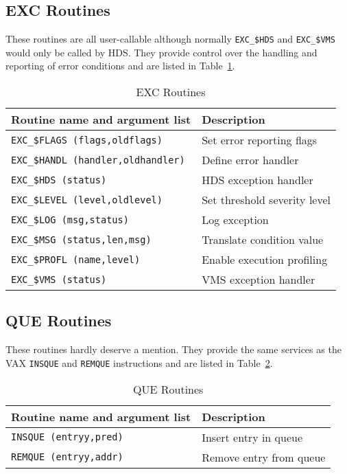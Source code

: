 \clearpage
\subsection {EXC Routines}

These routines are all user-callable although normally {\tt EXC\_\$HDS}
and {\tt EXC\_\$VMS} would only be called by HDS. They provide control over
the handling and reporting of error conditions and are listed in
Table~\ref{exc_routines}.

\begin {table}[htbp]
\begin {center}
\begin {tabular}{||l|l||}
\hline
Routine name and argument list		& Description \\
\hline
{\tt EXC\_\$FLAGS (flags,oldflags)}	& Set error reporting flags \\
{\tt EXC\_\$HANDL (handler,oldhandler)}	& Define error handler \\
{\tt EXC\_\$HDS (status)}		& HDS exception handler \\
{\tt EXC\_\$LEVEL (level,oldlevel)}	& Set threshold severity level \\
{\tt EXC\_\$LOG (msg,status)}		& Log exception \\
{\tt EXC\_\$MSG (status,len,msg)}	& Translate condition value \\
{\tt EXC\_\$PROFL (name,level)}		& Enable execution profiling \\
{\tt EXC\_\$VMS (status)}		& VMS exception handler \\
\hline
\end {tabular}
\caption {EXC Routines}
\label {exc_routines}
\end {center}
\end {table}

\subsection {QUE Routines}

These routines hardly deserve a mention. They provide the same services
as the VAX {\tt INSQUE} and {\tt REMQUE} instructions and are listed in
Table~\ref{que_routines}.

\begin {table}[htbp]
\begin {center}
\begin {tabular}{||l|l||}
\hline
Routine name and argument list	& Description \\
\hline
{\tt INSQUE (entryy,pred)}	& Insert entry in queue \\
{\tt REMQUE (entryy,addr)}	& Remove entry from queue \\
\hline
\end {tabular}
\caption {QUE Routines}
\label {que_routines}
\end {center}
\end {table}
              
